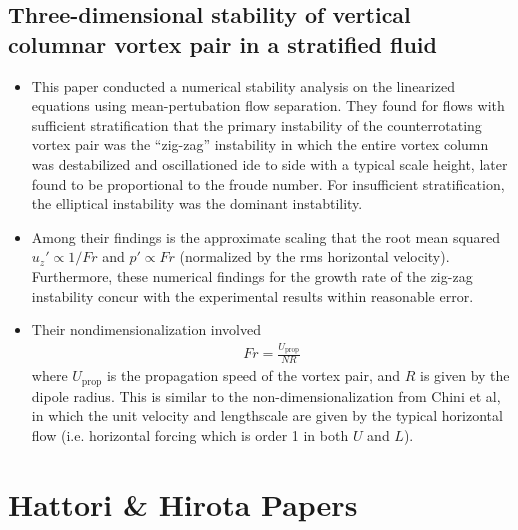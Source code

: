 \documentclass{article}
\begin{document}
    \subsection{Three-dimensional stability of vertical columnar vortex pair in a
    stratified fluid}

    \begin{itemize}
        \item This paper conducted a numerical stability analysis on the linearized
        equations using mean-pertubation flow separation. They found for flows
        with sufficient stratification that the primary instability of the
        counterrotating vortex pair was the ``zig-zag'' instability in which the
        entire vortex column was destabilized and oscillationed ide to side with a
        typical scale height, later found to be proportional to the froude number.
        For insufficient stratification, the elliptical instability was the dominant
        instabtility. 
        \item Among their findings is the approximate scaling that the root mean
        squared $u_z' \propto
        1/Fr$ and $p' \propto Fr$ (normalized by the rms horizontal velocity).
        Furthermore, these numerical findings for the growth rate of the zig-zag
        instability concur with the experimental results
        within reasonable error. 
        \item Their nondimensionalization involved 
        \begin{gather*}
            Fr = \frac{U_{\text{prop}}}{NR}
        \end{gather*}
        where $U_{\text{prop}}$ is the propagation speed of the vortex pair, and $R$
        is given by the dipole radius. This is similar to the non-dimensionalization
        from Chini et al, in which the unit velocity and lengthscale are given by
        the typical horizontal flow (i.e. horizontal forcing which is order 1 in
        both $U$ and $L$). 
    \end{itemize}


\section{Hattori \& Hirota Papers}
\end{document}
